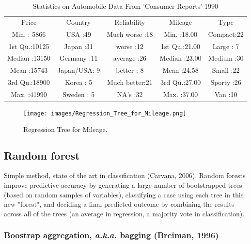 \documentclass[final, paper=letter,5p,times,twocolumn]{elsarticle}
\begin{document}
\begin{center}
\begin{table}[ht]
\begin{tabular}{ccccc}
     Price     &       Country &       Reliability &   Mileage    &       Type   \\
 Min.   : 5866 &  USA      :49 &  Much worse :18   & Min.   :18.00 &  Compact:22  \\
 1st Qu.:10125 &  Japan    :31 &  worse      :12   & 1st Qu.:21.00 &  Large  : 7  \\
 Median :13150 &  Germany  :11 &  average    :26   & Median :23.00 &  Medium :30  \\
 Mean   :15743 &  Japan/USA: 9 &  better     : 8   & Mean   :24.58 &  Small  :22  \\
 3rd Qu.:18900 &  Korea    : 5 &  Much better:21   & 3rd Qu.:27.00 &  Sporty :26  \\
 Max.   :41990 &  Sweden   : 5 &  NA's       :32   & Max.   :37.00 &  Van    :10  \\
\end{tabular}
\label{tab:cu.summary}
\caption{Statistics on Automobile Data From 'Consumer Reports' 1990}
\end{table}
\end{center}

\begin{figure}[htbp]
   \begin{center}
      \texttt{[image: images/Regression\_Tree\_for\_Mileage.png]}
   \end{center}
   \caption{Regression Tree for Mileage.}
  \label{fig:Tree_for_Kyphosis} 
\end{figure}

\subsection{Random forest}

Simple method, state of the art in classification (Carvana, 2006).
Random forests improve predictive accuracy by generating a large number of bootstrapped trees (based on random samples of variables), classifying a case using each tree in this new "forest", and deciding a final predicted outcome by combining the results across all of the trees (an average in regression, a majority vote in classification).

\subsubsection{Boostrap aggregation, {\it a.k.a.} bagging (Breiman, 1996)}
\end{document}
